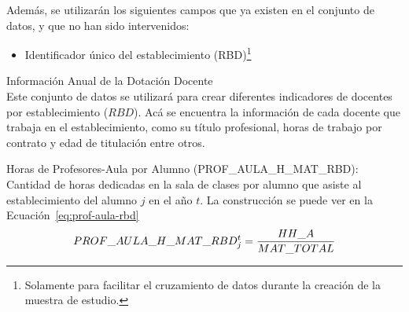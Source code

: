 \begin{longdescription}
\begin{longdescription}
                Además, se utilizarán los siguientes campos que ya existen en el conjunto de datos, y que no han sido intervenidos:
                \begin{itemize}
                  \item Identificador único del establecimiento (RBD)\footnote{Solamente para facilitar el cruzamiento de datos durante la creación de la muestra de estudio.}
                \end{itemize}
        \end{longdescription}
        \item[Información Anual de la Dotación Docente] \hfill \\
        Este conjunto de datos se utilizará para crear diferentes indicadores de docentes por establecimiento ($RBD$).
        Acá se encuentra la información de cada docente que trabaja en el establecimiento, como su título profesional, horas de trabajo por contrato y edad de titulación entre otros.
            \begin{longdescription}
                \item[Horas de Profesores-Aula por Alumno](PROF\_AULA\_H\_MAT\_RBD): Cantidad de horas dedicadas en la sala de clases por alumno que asiste al establecimiento del alumno $j$ en el año $t$.
                La construcción se puede ver en la Ecuación~\ref{eq:prof-aula-rbd}
                  \begin{equation}
                  \centering
                    PROF\_AULA\_H\_MAT\_RBD_{j}^{t} = \frac{HH\_A}{MAT\_TOTAL}
                    \label{eq:prof-aula-rbd}
                  \end{equation}
                

\end{longdescription}
\end{longdescription}
